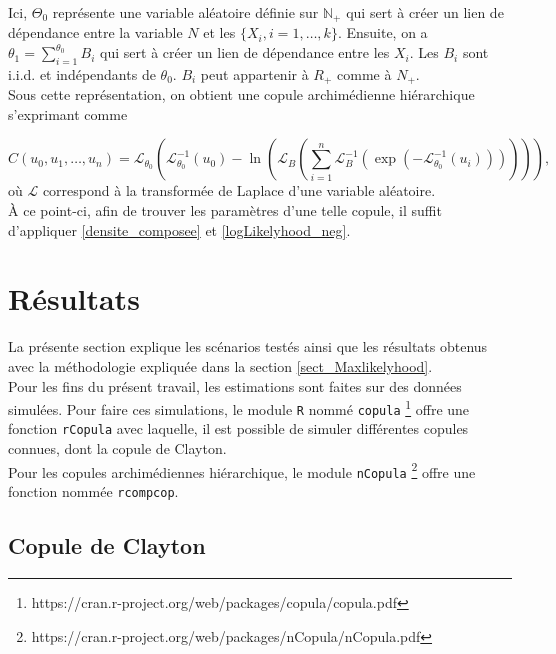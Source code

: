 \documentclass{article}
\begin{document}
	Ici, $\Theta_0$ représente une variable aléatoire définie sur $\mathbb{N}_+$ qui sert à créer un lien de dépendance entre la variable $N$ et les $\{X_i, i=1,\dots , k\}$. Ensuite, on a $\theta_1 = \sum_{i=1}^{\theta_0} B_i$ qui sert à créer un lien de dépendance entre les $X_i$. Les $B_i$ sont i.i.d. et indépendants de $\theta_0$. $B_i$ peut appartenir à $R_+$ comme à $N_+$. \\
	
	Sous cette représentation, on obtient une copule archimédienne hiérarchique s'exprimant comme
	
	\begin{equation}
	C(u_0, u_1, \dots, u_n) =
		\mathscr{L}_{\theta_0} \left(
			\mathscr{L}_{\theta_0}^{-1}(u_0) - \ln \left( 
				\mathscr{L}_B  \left(
					\sum_{i=1}^{n} \mathscr{L}_{B}^{-1} \left(
					 \exp \left(
					  - \mathscr{L}_{\theta_0}^{-1}(u_i) 
					  \right) \right)\right)\right)\right),
	\end{equation}
	où $\mathscr{L}$ correspond à la transformée de Laplace d'une variable aléatoire.\\
	
	À ce point-ci, afin de trouver les paramètres d'une telle copule, il suffit d'appliquer \eqref{densite_composee} et \eqref{logLikelyhood_neg}.
	
	\section{Résultats}
	La présente section explique les scénarios testés ainsi que les résultats obtenus avec la méthodologie expliquée dans la section \ref{sect_Maxlikelyhood}.\\
	
	Pour les fins du présent travail, les estimations sont faites sur des données simulées. Pour faire ces simulations, le module \texttt{R} nommé \texttt{copula} \footnote{https://cran.r-project.org/web/packages/copula/copula.pdf}
	offre une fonction \texttt{rCopula} avec laquelle, il est possible de simuler différentes copules connues, dont la copule de Clayton. \\
	
	Pour les copules archimédiennes hiérarchique, le module \texttt{nCopula} \footnote{https://cran.r-project.org/web/packages/nCopula/nCopula.pdf} offre une fonction nommée \texttt{rcompcop}.
	
	\subsection{Copule de Clayton}
\end{document}
